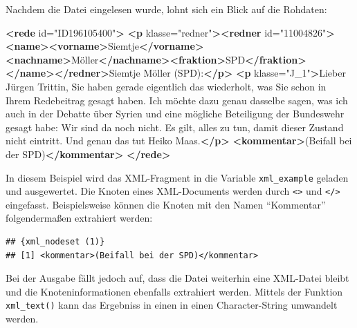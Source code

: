 \documentclass[oneside, 12pt, numbers=endperiod]{scrbook}
\newenvironment{Shaded}{\begin{snugshade}}{\end{snugshade}}
\newcommand{\KeywordTok}[1]{\textcolor[rgb]{0.13,0.29,0.53}{\textbf{#1}}}
\newcommand{\NormalTok}[1]{#1}
\newcommand{\OperatorTok}[1]{\textcolor[rgb]{0.81,0.36,0.00}{\textbf{#1}}}
\newcommand{\OtherTok}[1]{\textcolor[rgb]{0.56,0.35,0.01}{#1}}
\newcommand{\StringTok}[1]{\textcolor[rgb]{0.31,0.60,0.02}{#1}}
\theoremstyle{definition}
\theoremstyle{definition}
\theoremstyle{definition}
\theoremstyle{remark}
\begin{document}
Nachdem die Datei eingelesen wurde, lohnt sich ein Blick auf die
Rohdaten:

\begin{Shaded}
\begin{Highlighting}[]
\KeywordTok{<rede}\OtherTok{ id=}\StringTok{"ID196105400"}\KeywordTok{>}
  \KeywordTok{<p}\OtherTok{ klasse=}\StringTok{"redner"}\KeywordTok{><redner}\OtherTok{ id=}\StringTok{"11004826"}\KeywordTok{><name><vorname>}\NormalTok{Siemtje}\KeywordTok{</vorname><nachname>}\NormalTok{Möller}\KeywordTok{</nachname><fraktion>}\NormalTok{SPD}\KeywordTok{</fraktion></name></redner>}\NormalTok{Siemtje Möller (SPD):}\KeywordTok{</p>}
  \KeywordTok{<p}\OtherTok{ klasse=}\StringTok{"J_1"}\KeywordTok{>}\NormalTok{Lieber Jürgen Trittin, Sie haben gerade eigentlich das wiederholt, was Sie schon in Ihrem Redebeitrag gesagt haben. Ich möchte dazu genau dasselbe sagen, was ich auch in der Debatte über Syrien und eine mögliche Beteiligung der Bundeswehr gesagt habe: Wir sind da noch nicht. Es gilt, alles zu tun, damit dieser Zustand nicht eintritt. Und genau das tut Heiko Maas.}\KeywordTok{</p>}
  \KeywordTok{<kommentar>}\NormalTok{(Beifall bei der SPD)}\KeywordTok{</kommentar>}
\KeywordTok{</rede>}
\end{Highlighting}
\end{Shaded}

In diesem Beispiel wird das XML-Fragment in die Variable
\texttt{xml\_example} geladen und ausgewertet. Die Knoten eines
XML-Documents werden durch \texttt{\textless{}\textgreater{}} und
\texttt{\textless{}/\textgreater{}} eingefasst. Beispielsweise können
die Knoten mit den Namen ``Kommentar'' folgendermaßen extrahiert werden:

\begin{Shaded}
\end{Shaded}

\begin{verbatim}
## {xml_nodeset (1)}
## [1] <kommentar>(Beifall bei der SPD)</kommentar>
\end{verbatim}

Bei der Ausgabe fällt jedoch auf, dass die Datei weiterhin eine
XML-Datei bleibt und die Knoteninformationen ebenfalls extrahiert
werden. Mittels der Funktion \texttt{xml\_text()} kann das Ergebniss in
einen in einen Character-String umwandelt werden.
\end{document}
